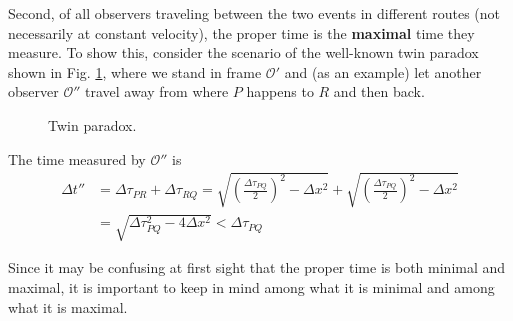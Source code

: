 \documentclass[11pt]{article}
\begin{document}
Second, of all observers traveling between the two events in different routes (not necessarily at constant velocity), the proper time is the \textbf{maximal} time they measure. To show this, consider the scenario of the well-known twin paradox shown in Fig. \ref{fig_twinparadox}, where we stand in frame $\mathcal{O}'$ and (as an example) let another observer $\mathcal{O}''$ travel away from where $P$ happens to $R$ and then back.
\begin{figure}[H]
    \centering
    \caption{Twin paradox.}
    \label{fig_twinparadox}
\end{figure}
The time measured by $\mathcal{O}''$ is
\begin{equation}\begin{aligned}
    \Delta t'' & =\Delta\tau_{PR}+\Delta\tau_{RQ}=\sqrt{\left(\frac{\Delta\tau_{PQ}}{2}\right)^2-\Delta x^2}+\sqrt{\left(\frac{\Delta\tau_{PQ}}{2}\right)^2-\Delta x^2} \\
    & =\sqrt{\Delta\tau_{PQ}^2-4\Delta x^2}<\Delta\tau_{PQ}
\end{aligned}\end{equation}

Since it may be confusing at first sight that the proper time is both minimal and maximal, it is important to keep in mind among what it is minimal and among what it is maximal.
\end{document}
